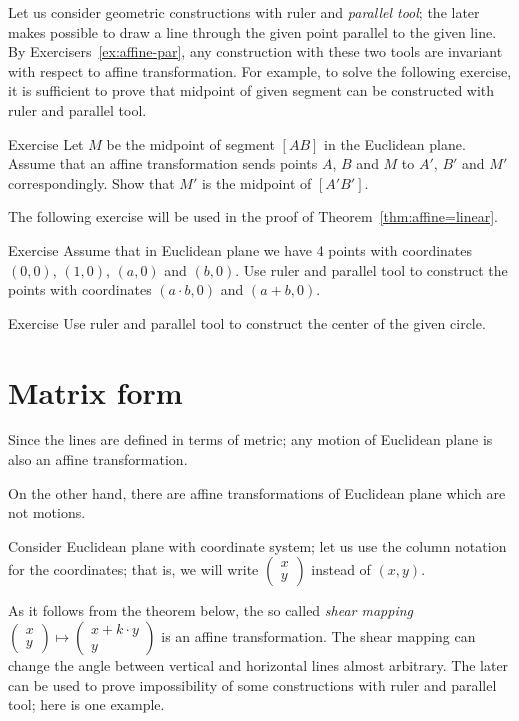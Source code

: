 Let us consider geometric constructions with ruler and \emph{parallel tool};
the later makes possible to draw a line through the given point parallel to the given line.
By Exercisers~\ref{ex:affine-par}, any construction with these two tools are invariant with respect to affine transformation.
For example, 
to solve the following exercise,
it is sufficient to prove that midpoint of given segment can be constructed with ruler and parallel tool.

\begin{thm}{Exercise}\label{ex:midpoint-affine}
Let $M$ be the midpoint of segment $[AB]$ in the Euclidean plane.
Assume that an affine transformation sends points $A$, $B$ and $M$
to $A'$, $B'$ and $M'$ correspondingly.
Show that $M'$ is the midpoint of $[A'B']$.
\end{thm}

The following exercise will be used in the proof of Theorem~\ref{thm:affine=linear}.

\begin{thm}{Exercise}\label{ex:R-hom}
Assume that in Euclidean plane we have 4 points with coordinates 
$(0,0)$, $(1,0)$, $(a,0)$ and $(b,0)$.
Use ruler and parallel tool to construct the points with coordinates $(a\cdot b,0)$ and $(a+b,0)$.
\end{thm}

\begin{thm}{Exercise}\label{ex:center-circ-affine}
Use ruler and parallel tool to construct the center of the given circle.
\end{thm}

\section*{Matrix form}

Since the lines are defined in terms of metric;
any motion of Euclidean plane is also an affine transformation.

On the other hand, 
there are affine transformations of Euclidean plane which are not motions.

Consider Euclidean plane with coordinate system;
let us use the column notation for the coordinates;
that is, we will write $\left(\begin{smallmatrix}
x\\y
\end{smallmatrix} \right)$ instead of $(x,y)$.

As it follows from the theorem below,
the so called {}\emph{shear mapping} $\left(\begin{smallmatrix}
x\\ y
\end{smallmatrix} \right)\mapsto \left(\begin{smallmatrix}
x+k\cdot y\\ y
\end{smallmatrix} \right)$ is an affine transformation.
The shear mapping can change the angle between vertical and horizontal lines almost arbitrary.
The later can be used to prove impossibility of some constructions with ruler and parallel tool;
here is one example.

